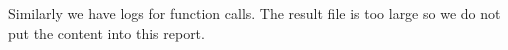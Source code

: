 \documentclass[letterpaper,twocolumn,10pt]{article}
\newcommand{\work}{\mbox{\textsc{RADAR}}\xspace}
\begin{document}
Similarly we have logs for function calls.
The result file is too large so we do not put the content into this report.








\end{document}
